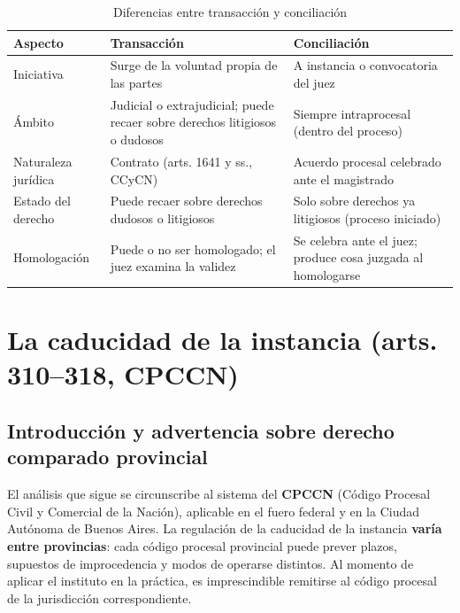 \documentclass[12pt,oneside]{book}
\begin{document}
\begin{table}[H]
\centering
\begin{tabularx}{\textwidth}{
    >{\raggedright\arraybackslash}p{}
    >{\raggedright\arraybackslash}X
    >{\raggedright\arraybackslash}X
}
\toprule
\textbf{Aspecto} & \textbf{Transacción} & \textbf{Conciliación} \\
\midrule
Iniciativa & Surge de la voluntad propia de las partes & A instancia o convocatoria del juez \\
\addlinespace
Ámbito & Judicial o extrajudicial; puede recaer sobre derechos litigiosos o dudosos & Siempre intraprocesal (dentro del proceso) \\
\addlinespace
Naturaleza jurídica & Contrato (arts. 1641 y ss., CCyCN) & Acuerdo procesal celebrado ante el magistrado \\
\addlinespace
Estado del derecho & Puede recaer sobre derechos dudosos o litigiosos & Solo sobre derechos ya litigiosos (proceso iniciado) \\
\addlinespace
Homologación & Puede o no ser homologado; el juez examina la validez & Se celebra ante el juez; produce cosa juzgada al homologarse \\
\bottomrule
\end{tabularx}
\caption{Diferencias entre transacción y conciliación}
\end{table}

\chapter{La caducidad de la instancia (arts. 310--318, CPCCN)}

\section{Introducción y advertencia sobre derecho comparado provincial}

\begin{important}
El análisis que sigue se circunscribe al sistema del \textbf{CPCCN} (Código Procesal Civil y Comercial de la Nación), aplicable en el fuero federal y en la Ciudad Autónoma de Buenos Aires. La regulación de la caducidad de la instancia \textbf{varía entre provincias}: cada código procesal provincial puede prever plazos, supuestos de improcedencia y modos de operarse distintos. Al momento de aplicar el instituto en la práctica, es imprescindible remitirse al código procesal de la jurisdicción correspondiente.
\end{important}
\end{document}
